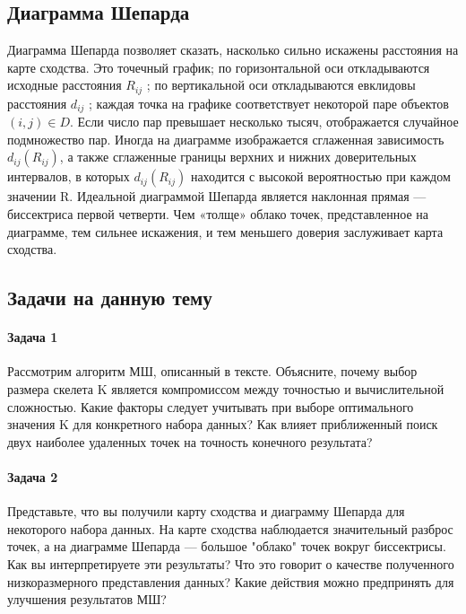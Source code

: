 \subsection*{Диаграмма Шепарда}

Диаграмма Шепарда позволяет сказать, насколько сильно искажены расстояния на карте сходства. Это точечный график; по горизонтальной оси откладываются исходные расстояния $R_{ij}$ ; по вертикальной оси откладываются евклидовы расстояния $d_{ij}$ ; каждая точка на графике соответствует некоторой паре объектов $(i, j) \in D$. Если число пар превышает несколько тысяч, отображается случайное подмножество	пар. Иногда на диаграмме изображается сглаженная зависимость $d_{ij} (R_{ij} )$, а также	сглаженные границы верхних и нижних доверительных интервалов, в которых $d_{ij} (R_{ij})$	находится с высокой вероятностью при каждом значении R.	Идеальной диаграммой Шепарда является наклонная прямая — биссектриса	первой четверти. Чем «толще» облако точек, представленное на диаграмме, тем сильнее искажения, и тем меньшего доверия заслуживает карта сходства.

\subsection*{Задачи на данную тему}

\paragraph*{Задача 1}

Рассмотрим алгоритм МШ, описанный в тексте. Объясните, почему выбор размера скелета K является компромиссом между точностью и вычислительной сложностью. Какие факторы следует учитывать при выборе оптимального значения K для конкретного набора данных? Как влияет приближенный поиск двух наиболее удаленных точек на точность конечного результата?	


\paragraph*{Задача 2}

Представьте, что вы получили карту сходства и диаграмму Шепарда для некоторого набора данных. На карте сходства наблюдается значительный разброс точек, а на диаграмме Шепарда — большое "облако" точек вокруг биссектрисы. Как вы интерпретируете эти результаты? Что это говорит о качестве полученного низкоразмерного представления данных? Какие действия можно предпринять для улучшения результатов МШ?

